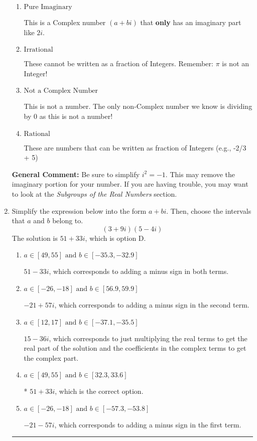 \documentclass{extbook}[14pt]
\newcommand{\litem}[1]{\item #1

\rule{\textwidth}{0.4pt}}
\begin{document}
\begin{enumerate}
{\begin{enumerate}[label=\Alph*.]
* This is the correct option!
\item \( \text{Pure Imaginary} \)

This is a Complex number $(a+bi)$ that \textbf{only} has an imaginary part like $2i$.
\item \( \text{Irrational} \)

These cannot be written as a fraction of Integers. Remember: $\pi$ is not an Integer!
\item \( \text{Not a Complex Number} \)

This is not a number. The only non-Complex number we know is dividing by 0 as this is not a number!
\item \( \text{Rational} \)

These are numbers that can be written as fraction of Integers (e.g., -2/3 + 5)
\end{enumerate}

\textbf{General Comment:} Be sure to simplify $i^2 = -1$. This may remove the imaginary portion for your number. If you are having trouble, you may want to look at the \textit{Subgroups of the Real Numbers} section.
}
\litem{
Simplify the expression below into the form $a+bi$. Then, choose the intervals that $a$ and $b$ belong to.
\[ (3 + 9 i)(5 - 4 i) \]The solution is \( 51 + 33 i \), which is option D.\begin{enumerate}[label=\Alph*.]
\item \( a \in [49, 55] \text{ and } b \in [-35.3, -32.9] \)

 $51 - 33 i$, which corresponds to adding a minus sign in both terms.
\item \( a \in [-26, -18] \text{ and } b \in [56.9, 59.9] \)

 $-21 + 57 i$, which corresponds to adding a minus sign in the second term.
\item \( a \in [12, 17] \text{ and } b \in [-37.1, -35.5] \)

 $15 - 36 i$, which corresponds to just multiplying the real terms to get the real part of the solution and the coefficients in the complex terms to get the complex part.
\item \( a \in [49, 55] \text{ and } b \in [32.3, 33.6] \)

* $51 + 33 i$, which is the correct option.
\item \( a \in [-26, -18] \text{ and } b \in [-57.3, -53.8] \)

 $-21 - 57 i$, which corresponds to adding a minus sign in the first term.
\end{enumerate}

}
\end{enumerate}
\end{document}
